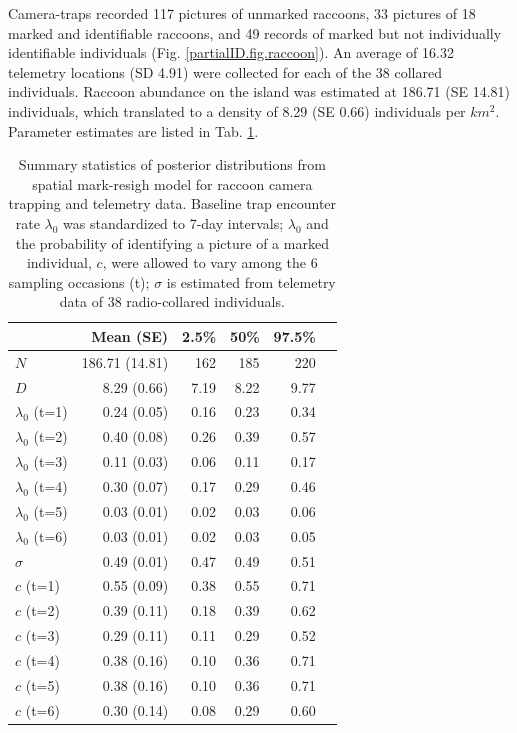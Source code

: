 Camera-traps recorded 117 pictures of unmarked raccoons, 33 pictures of 18 marked and identifiable raccoons, and 49 records of marked but not individually identifiable individuals (Fig. \ref{partialID.fig.raccoon}). An average of 16.32 telemetry locations (SD 4.91) were collected for each of the 38 collared individuals. Raccoon abundance on the island was estimated at 186.71 (SE 14.81) individuals, which translated to a density of 8.29 (SE 0.66) individuals per $km^2$. Parameter estimates are listed in Tab. \ref{partialID.tab.raccoons}.

\begin{table}%
\centering
\caption{Summary statistics of posterior distributions
from spatial mark-resigh model for raccoon camera trapping and telemetry data. Baseline trap encounter rate $\lambda_0$ was standardized to 7-day intervals; $\lambda_0$ and the probability of identifying a picture of a marked individual, $c$, were allowed to vary among the 6 sampling occasions (t); $\sigma$ is estimated from telemetry data of 38 radio-collared individuals.}
\begin{tabular}{lrrrrr}
\hline
   &	Mean (SE) &	2.5\% &	50\%	& 97.5\% \\
 \hline
$N$	& 186.71 (14.81) & 162 & 185	& 220 \\
$D$	& 8.29 (0.66)	& 7.19	& 8.22	& 9.77 \\
$\lambda_0$ (t=1)	& 0.24 (0.05) & 0.16 & 0.23 & 0.34 \\
$\lambda_0$ (t=2)	& 0.40 (0.08)	& 0.26	& 0.39	& 0.57 \\
$\lambda_0$ (t=3)	& 0.11 (0.03) & 0.06 & 0.11	& 0.17 \\
$\lambda_0$ (t=4)	& 0.30 (0.07)	& 0.17	& 0.29	& 0.46 \\
$\lambda_0$ (t=5)	& 0.03 (0.01)	& 0.02	& 0.03	& 0.06 \\
$\lambda_0$ (t=6)	& 0.03 (0.01)	& 0.02	& 0.03	& 0.05 \\
$\sigma$	& 0.49 (0.01)	& 0.47	& 0.49	& 0.51 \\
$c$ (t=1)	& 0.55 (0.09)	& 0.38	& 0.55	& 0.71 \\
$c$ (t=2)	& 0.39 (0.11)	& 0.18	& 0.39	& 0.62 \\
$c$ (t=3)	& 0.29 (0.11) & 0.11	& 0.29	& 0.52 \\
$c$ (t=4)	& 0.38 (0.16)	& 0.10	& 0.36	& 0.71 \\
$c$ (t=5)	& 0.38 (0.16)	& 0.10	& 0.36	& 0.71 \\
$c$ (t=6)	& 0.30 (0.14)	& 0.08	& 0.29	& 0.60 \\
 \hline
\end{tabular}
\label{partialID.tab.raccoons}
\end{table}

